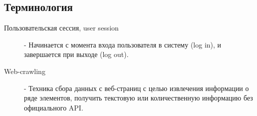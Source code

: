 \subsection{Терминология}
\begin{description}

\item[Пользовательская сессия, user session] - 
    Начинается с момента входа пользователя в систему (log in), и завершается при выходе (log out).

\item[Web-crawling] - 
    Техника сбора данных с веб-страниц с целью извлечения информации о ряде элементов, получить текстовую или 
        количественную информацию без официального API.
\end{description}

